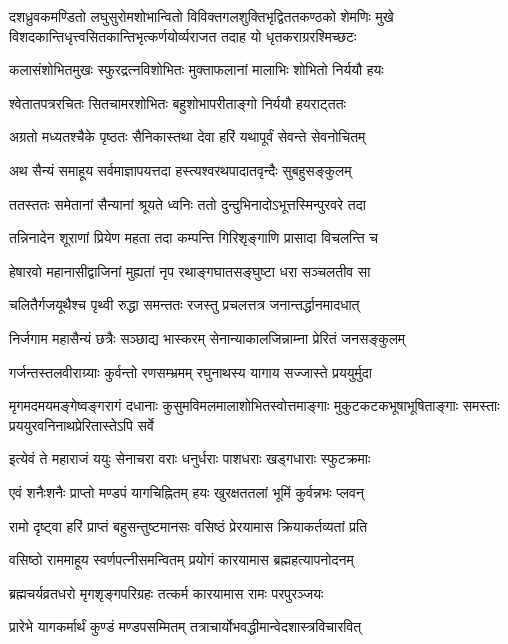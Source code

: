 \twolineshloka
{दशध्रुवकमण्डितो लघुसुरोमशोभान्वितो विविक्तगलशुक्तिभृद्विततकण्ठको शेमणिः मुखे}
{विशदकान्तिधृत्त्वसितकान्तिभृत्कर्णयोर्व्यराजत तदाह यो धृतकराग्ररश्मिच्छटः}%

\twolineshloka
{कलासंशोभितमुखः स्फुरद्रत्नविशोभितः}
{मुक्ताफलानां मालाभिः शोभितो निर्ययौ हयः}%

\twolineshloka
{श्वेतातपत्ररचितः सितचामरशोभितः}
{बहुशोभापरीताङ्गो निर्ययौ हयराट्ततः}%

\twolineshloka
{अग्रतो मध्यतश्चैके पृष्ठतः सैनिकास्तथा}
{देवा हरिं यथापूर्वं सेवन्ते सेवनोचितम्}%

\twolineshloka
{अथ सैन्यं समाहूय सर्वमाज्ञापयत्तदा}
{हस्त्यश्वरथपादातवृन्दैः सुबहुसङ्कुलम्}%

\twolineshloka
{ततस्ततः समेतानां सैन्यानां श्रूयते ध्वनिः}
{ततो दुन्दुभिनादोऽभूत्तस्मिन्पुरवरे तदा}%

\twolineshloka
{तन्निनादेन शूराणां प्रियेण महता तदा}
{कम्पन्ति गिरिशृङ्गाणि प्रासादा विचलन्ति च}%

\twolineshloka
{हेषारवो महानासीद्वाजिनां मुह्यतां नृप}
{रथाङ्गघातसङ्घुष्टा धरा सञ्चलतीव सा}%

\twolineshloka
{चलितैर्गजयूथैश्च पृथ्वी रुद्धा समन्ततः}
{रजस्तु प्रचलत्तत्र जनान्तर्द्धानमादधात्}%

\twolineshloka
{निर्जगाम महासैन्यं छत्रैः सञ्छाद्य भास्करम्}
{सेनान्याकालजिन्नाम्ना प्रेरितं जनसङ्कुलम्}%

\twolineshloka
{गर्जन्तस्तलवीराग्र्याः कुर्वन्तो रणसम्भ्रमम्}
{रघुनाथस्य यागाय सज्जास्ते प्रययुर्मुदा}%

\twolineshloka
{मृगमदमयमङ्गेष्वङ्गरागं दधानाः कुसुमविमलमालाशोभितस्वोत्तमाङ्गाः}
{मुकुटकटकभूषाभूषिताङ्गाः समस्ताः प्रययुरवनिनाथप्रेरितास्तेऽपि सर्वे}%

\twolineshloka
{इत्येवं ते महाराजं ययुः सेनाचरा वराः}
{धनुर्धराः पाशधराः खड्गधाराः स्फुटक्रमाः}%

\twolineshloka
{एवं शनैःशनैः प्राप्तो मण्डपं यागचिह्नितम्}
{हयः खुरक्षततलां भूमिं कुर्वन्नभः प्लवन्}%

\twolineshloka
{रामो दृष्ट्वा हरिं प्राप्तं बहुसन्तुष्टमानसः}
{वसिष्ठं प्रेरयामास क्रियाकर्तव्यतां प्रति}%

\twolineshloka
{वसिष्ठो राममाहूय स्वर्णपत्नीसमन्वितम्}
{प्रयोगं कारयामास ब्रह्महत्यापनोदनम्}%

\twolineshloka
{ब्रह्मचर्यव्रतधरो मृगशृङ्गपरिग्रहः}
{तत्कर्म कारयामास रामः परपुरञ्जयः}%

\twolineshloka
{प्रारेभे यागकर्मार्थं कुण्डं मण्डपसम्मितम्}
{तत्राचार्योभवद्धीमान्वेदशास्त्रविचारवित्}%

